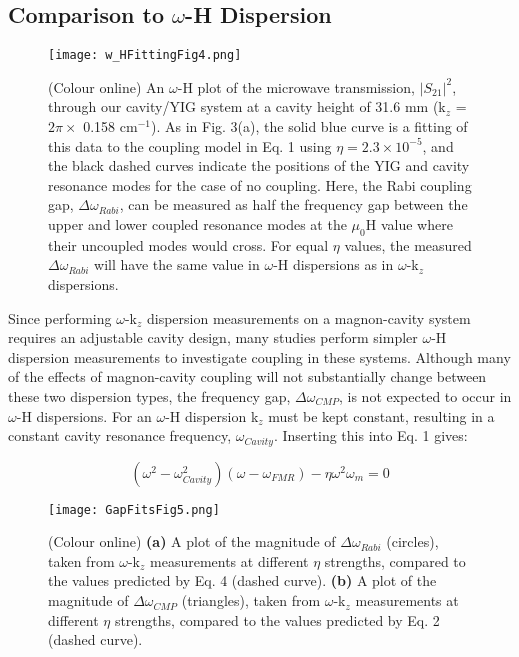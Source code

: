 \documentclass[prb,twocolumn,showpacs,preprintnumbers,amsmath,amssymb]{revtex4-1}
\begin{document}
\subsection{Comparison to $\omega$-H Dispersion}


\begin{figure}[b]
\centering
\texttt{[image: w\_HFittingFig4.png]}
\caption{(Colour online) An $\omega$-H plot of the microwave transmission, $|S_{21}|^{2}$, through our cavity/YIG system at a cavity height of 31.6 mm (k$_{z}$ = $2\pi\times$ 0.158 cm$^{-1}$). As in Fig. 3(a), the solid blue curve is a fitting of this data to the coupling model in Eq. 1 using $\eta=2.3\times 10^{-5}$, and the black dashed curves indicate the positions of the YIG and cavity resonance modes for the case of no coupling. Here, the Rabi coupling gap, $\Delta\omega_{Rabi}$, can be measured as half the frequency gap between the upper and lower coupled resonance modes at the $\mu_{0}$H value where their uncoupled modes would cross. For equal $\eta$ values, the measured $\Delta\omega_{Rabi}$ will have the same value in $\omega$-H dispersions as in $\omega$-k$_{z}$ dispersions.}
\label{Figure 4}
\end{figure}

Since performing $\omega$-k$_{z}$ dispersion measurements on a magnon-cavity system requires an adjustable cavity design, many studies perform simpler $\omega$-H dispersion measurements to investigate coupling in these systems\cite{A,B,C,F,Q}. Although many of the effects of magnon-cavity coupling will not substantially change between these two dispersion types, the frequency gap, $\Delta\omega_{CMP}$, is not expected to occur in $\omega$-H dispersions. For an $\omega$-H dispersion k$_{z}$ must be kept constant, resulting in a constant cavity resonance frequency, $\omega_{Cavity}$. Inserting this into Eq. 1 gives:

\begin{equation}
(\omega^{2}-\omega_{Cavity}^{2})(\omega-\omega_{FMR})-\eta\omega^{2}\omega_{m}=0
\end{equation}

\begin{figure}[t]
\centering
\texttt{[image: GapFitsFig5.png]}
\caption{(Colour online) \textbf{(a)} A plot of the magnitude of $\Delta\omega_{Rabi}$ (circles), taken from $\omega$-k$_{z}$ measurements at different $\eta$ strengths, compared to the values predicted by Eq. 4 (dashed curve). \textbf{(b)} A plot of the magnitude of $\Delta\omega_{CMP}$ (triangles), taken from $\omega$-k$_{z}$ measurements at different $\eta$ strengths, compared to the values predicted by Eq. 2 (dashed curve).}
\label{Figure 5}
\end{figure}
\end{document}
